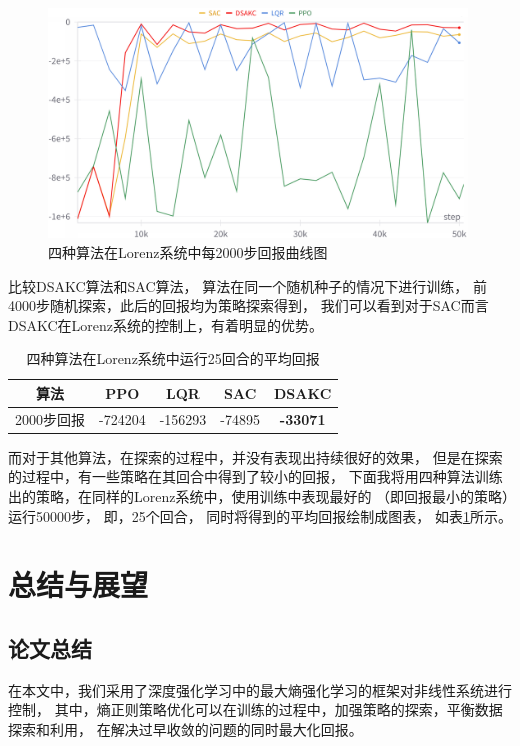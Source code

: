 \documentclass[AutoFakeBold]{LZUThesis}
\begin{document}
\begin{figure}[htbp]
  \centering
  \includegraphics[width=0.99\textwidth]{figures/train_return.png}
  \caption{四种算法在Lorenz系统中每2000步回报曲线图}
  \label{episodic_return}
\end{figure}

比较DSAKC算法和SAC算法，
算法在同一个随机种子的情况下进行训练，
前4000步随机探索，此后的回报均为策略探索得到，
我们可以看到对于SAC而言DSAKC在Lorenz系统的控制上，有着明显的优势。
\newpage

\begin{table}[h]
  \centering
  \begin{tabular}{ccccc}
    \toprule
    算法 & PPO & LQR & SAC & DSAKC \\
    \midrule
    2000步回报 & -724204 & -156293 & -74895 & \textbf{-33071} \\
    \bottomrule
  \end{tabular}
  \caption{四种算法在Lorenz系统中运行25回合的平均回报}
  \label{average_return}
\end{table}
而对于其他算法，在探索的过程中，并没有表现出持续很好的效果，
但是在探索的过程中，有一些策略在其回合中得到了较小的回报，
下面我将用四种算法训练出的策略，在同样的Lorenz系统中，使用训练中表现最好的
（即回报最小的策略）运行50000步，
即，25个回合，
同时将得到的平均回报绘制成图表，
如表\ref{average_return}所示。

\chapter{总结与展望}
\section{论文总结}
在本文中，我们采用了深度强化学习中的最大熵强化学习的框架对非线性系统进行控制，
其中，熵正则策略优化可以在训练的过程中，加强策略的探索，平衡数据探索和利用，
在解决过早收敛的问题的同时最大化回报。
\end{document}
